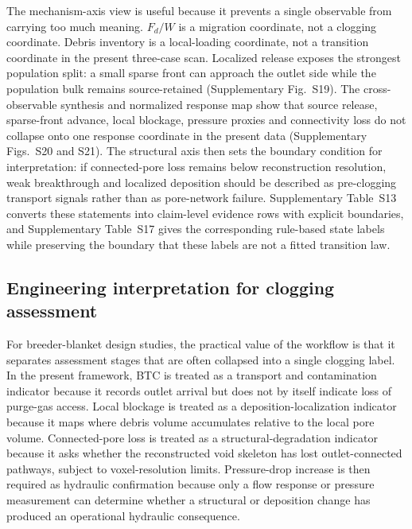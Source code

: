 \documentclass[preprint,12pt,authoryear]{elsarticle}
\newcommand{\FdW}{$F_d/W$\xspace}
\newcommand{\BTC}{BTC\xspace}
\begin{document}
The mechanism-axis view is useful because it prevents a single observable from carrying too much meaning. \FdW is a migration coordinate, not a clogging coordinate. Debris inventory is a local-loading coordinate, not a transition coordinate in the present three-case scan. Localized release exposes the strongest population split: a small sparse front can approach the outlet side while the population bulk remains source-retained (Supplementary Fig.~S19). The cross-observable synthesis and normalized response map show that source release, sparse-front advance, local blockage, pressure proxies and connectivity loss do not collapse onto one response coordinate in the present data (Supplementary Figs.~S20 and S21). The structural axis then sets the boundary condition for interpretation: if connected-pore loss remains below reconstruction resolution, weak breakthrough and localized deposition should be described as pre-clogging transport signals rather than as pore-network failure. Supplementary Table~S13 converts these statements into claim-level evidence rows with explicit boundaries, and Supplementary Table~S17 gives the corresponding rule-based state labels while preserving the boundary that these labels are not a fitted transition law.

\subsection{Engineering interpretation for clogging assessment}

For breeder-blanket design studies, the practical value of the workflow is that it separates assessment stages that are often collapsed into a single clogging label. In the present framework, \BTC is treated as a transport and contamination indicator because it records outlet arrival but does not by itself indicate loss of purge-gas access. Local blockage is treated as a deposition-localization indicator because it maps where debris volume accumulates relative to the local pore volume. Connected-pore loss is treated as a structural-degradation indicator because it asks whether the reconstructed void skeleton has lost outlet-connected pathways, subject to voxel-resolution limits. Pressure-drop increase is then required as hydraulic confirmation because only a flow response or pressure measurement can determine whether a structural or deposition change has produced an operational hydraulic consequence.
\end{document}
